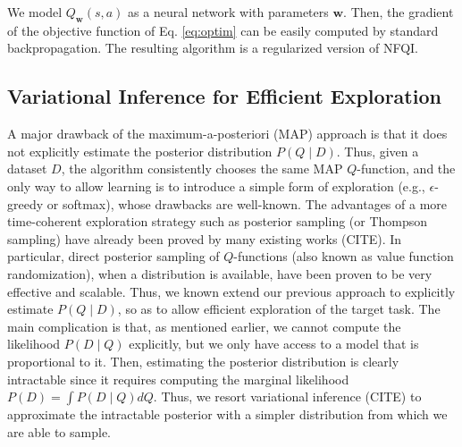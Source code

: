 \documentclass{article}
\begin{document}
We model $Q_{\bm{w}}(s,a)$ as a neural network with parameters $\bm{w}$. Then, the gradient of the objective function of Eq. \eqref{eq:optim} can be easily computed by standard backpropagation. The resulting algorithm is a regularized version of NFQI.

\subsection{Variational Inference for Efficient Exploration}

A major drawback of the maximum-a-posteriori (MAP) approach is that it does not explicitly estimate the posterior distribution $P(Q \mid D)$. Thus, given a dataset $D$, the algorithm consistently chooses the same MAP $Q$-function, and the only way to allow learning is to introduce a simple form of exploration (e.g., $\epsilon$-greedy or softmax), whose drawbacks are well-known. The advantages of a more time-coherent exploration strategy such as posterior sampling (or Thompson sampling) have already been proved by many existing works (CITE). In particular, direct posterior sampling of $Q$-functions (also known as value function randomization), when a distribution is available, have been proven to be very effective and scalable. Thus, we known extend our previous approach to explicitly estimate $P(Q \mid D)$, so as to allow efficient exploration of the target task. The main complication is that, as mentioned earlier, we cannot compute the likelihood $P(D \mid Q)$ explicitly, but we only have access to a model that is proportional to it. Then, estimating the posterior distribution is clearly intractable since it requires computing the marginal likelihood $P(D) = \int P(D \mid Q) dQ$. Thus, we resort variational inference (CITE) to approximate the intractable posterior with a simpler distribution from which we are able to sample.
\end{document}
